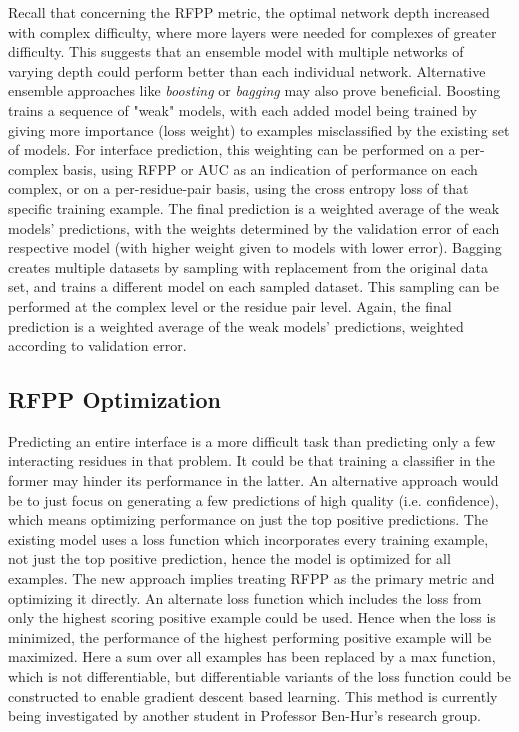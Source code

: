 Recall that concerning the RFPP metric, the optimal network depth increased with complex difficulty, where more layers were needed for complexes of greater difficulty. 
This suggests that an ensemble model with multiple networks of varying depth could perform  better than each individual network.
Alternative ensemble approaches like \emph{boosting} or \emph{bagging} may also prove beneficial.
Boosting trains a sequence of "weak" models, with each added model being trained by giving more importance (loss weight) to examples misclassified by the existing set of models.
For interface prediction, this weighting can be performed on a per-complex basis, using RFPP or AUC as an indication of performance on each complex, or on a per-residue-pair basis, using the cross entropy loss of that specific training example.
The final prediction is a weighted average of the weak models' predictions, with the weights determined by the validation error of each respective model (with higher weight given to models with lower error).
Bagging creates multiple datasets by sampling with replacement from the original data set, and trains a different model on each sampled dataset.
This sampling can be performed at the complex level or the residue pair level.
Again, the final prediction is a weighted average of the weak models' predictions, weighted according to validation error.



\subsection{RFPP Optimization}

Predicting an entire interface is a more difficult task than predicting only a few interacting residues in that problem.
It could be that training a classifier in the former may hinder its performance in the latter.
An alternative approach would be to just focus on generating a few predictions of high quality (i.e. confidence), which means optimizing performance on just the top positive predictions.
The existing model uses a loss function which incorporates every training example, not just the top positive prediction, hence the model is optimized for all examples.
The new approach implies treating RFPP as the primary metric and optimizing it directly.
An alternate loss function which includes the loss from only the highest scoring positive example could be used.
Hence when the loss is minimized, the performance of the highest performing positive example will be maximized.
Here a sum over all examples has been replaced by a max function, which is not differentiable, but differentiable variants of the loss function could be constructed to enable gradient descent based learning.
This method is currently being investigated by another student in Professor Ben-Hur's research group.


